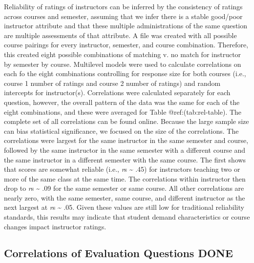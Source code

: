 \documentclass[man]{apa6}
\theoremstyle{definition}
\theoremstyle{definition}
\theoremstyle{definition}
\theoremstyle{remark}
\begin{document}
Reliability of ratings of instructors can be inferred by the consistency
of ratings across courses and semester, assuming that we infer there is
a stable good/poor instructor attribute and that these multiple
administrations of the same question are multiple assessments of that
attribute. A file was created with all possible course pairings for
every instructor, semester, and course combination. Therefore, this
created eight possible combinations of matching v. no match for
instructor by semester by course. Multilevel models were used to
calculate correlations on each fo the eight combinations controlling for
response size for both courses (i.e., course 1 number of ratings and
course 2 number of ratings) and random intercepts for instructor(s).
Correlations were calculated separately for each question, however, the
overall pattern of the data was the same for each of the eight
combinations, and these were averaged for Table @ref:(tab:rel-table).
The complete set of all correlations can be found online. Because the
large sample size can bias statistical significance, we focused on the
size of the correlations. The correlations were largest for the same
instructor in the same semester and course, followed by the same
instructor in the same semester with a different course and the same
instructor in a different semester with the same course. The first shows
that scores are somewhat reliable (i.e., \emph{r}s \textasciitilde{}
.45) for instructors teaching two or more of the same class at the same
time. The correlations within instructor then drop to \emph{r}s
\textasciitilde{} .09 for the same semester or same course. All other
correlations are nearly zero, with the same semester, same course, and
different instructor as the next largest at \emph{r}s \textasciitilde{}
.05. Given these values are still low for traditional reliability
standards, this results may indicate that student demand characteristics
or course changes impact instructor ratings.

\hypertarget{correlations-of-evaluation-questions-done}{%
\subsection{Correlations of Evaluation Questions
DONE}\label{correlations-of-evaluation-questions-done}}
\end{document}
